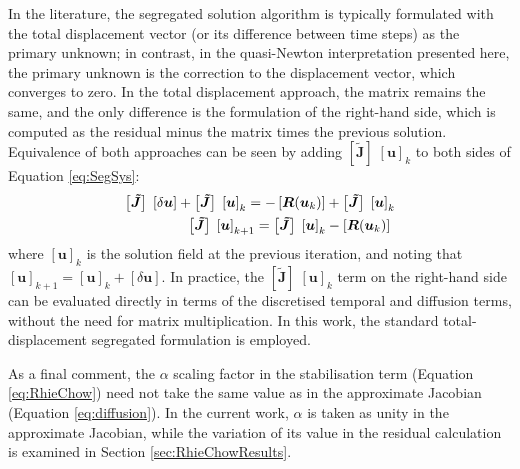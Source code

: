 \documentclass[sn-mathphys,Numbered]{sn-jnl}%
\newcommand{\bb}{\boldsymbol}
\begin{document}
In the literature, the segregated solution algorithm is typically formulated with the total displacement vector (or its difference between time steps) as the primary unknown; in contrast, in the quasi-Newton interpretation presented here, the primary unknown is the correction to the displacement vector, which converges to zero.
In the total displacement approach, the matrix remains the same, and the only difference is the formulation of the right-hand side, which is computed as the residual minus the matrix times the previous solution.
Equivalence of both approaches can be seen by adding $\left[ \bb{\tilde{J}} \right]  \; \left[ \bb{u} \right]_k$ to both sides of Equation \ref{eq:SegSys}:
\begin{eqnarray} \label{eq:SegSys}
    \left[ \bb{\tilde{J}} \right]  \; \left[ \delta \bb{u} \right] + \left[ \bb{\tilde{J}} \right]  \; \left[ \bb{u} \right]_k  = - \left[\bb{R}(\bb{u}_k)\right] + \left[ \bb{\tilde{J}} \right]  \; \left[ \bb{u} \right]_k \notag \\
    \left[ \bb{\tilde{J}} \right]  \; \left[ \bb{u} \right]_{k+1} = \left[ \bb{\tilde{J}} \right]  \; \left[ \bb{u} \right]_k - \left[\bb{R}(\bb{u}_k)\right] \
\end{eqnarray}
where $\left[ \bb{u} \right]_k$ is the solution field at the previous iteration, and noting that $\left[ \bb{u} \right]_{k+1} = \left[ \bb{u} \right]_k + \left[ \delta \bb{u} \right]$.
In practice, the $\left[ \bb{\tilde{J}} \right]  \; \left[ \bb{u} \right]_k$ term on the right-hand side can be evaluated directly in terms of the discretised temporal and diffusion terms, without the need for matrix multiplication.
In this work, the standard total-displacement segregated formulation is employed.

As a final comment, the $\alpha$ scaling factor in the stabilisation term (Equation \ref{eq:RhieChow}) need not take the same value as in the approximate Jacobian (Equation \ref{eq:diffusion}).
In the current work, $\alpha$ is taken as unity in the approximate Jacobian, while the variation of its value in the residual calculation is examined in Section \ref{sec:RhieChowResults}.

\end{document}

